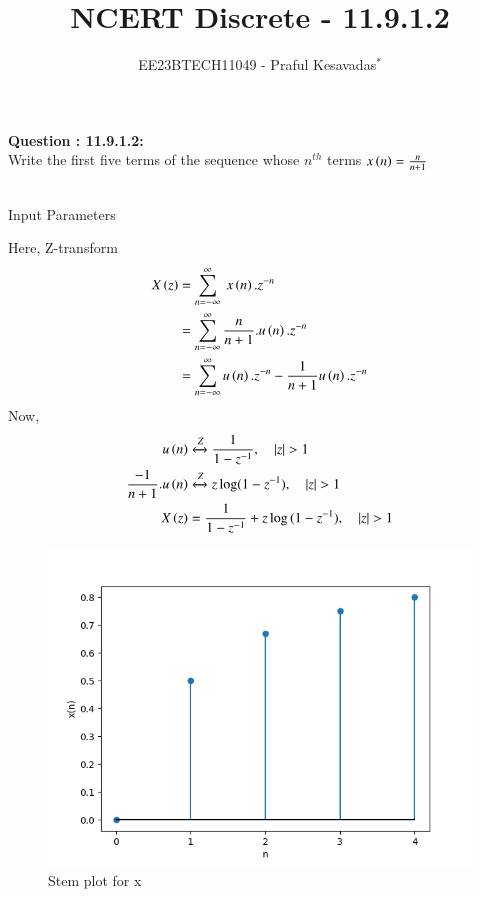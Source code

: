 \documentclass[journal,12pt,onecolumn]{IEEEtran}
\theoremstyle{remark}
\begin{document}

\vspace{3cm}

\title{NCERT Discrete - 11.9.1.2}
\author{EE23BTECH11049 - Praful Kesavadas$^{*}$%
}
\maketitle

\bigskip

\renewcommand{\thefigure}{\theenumi}
\renewcommand{\thetable}{\theenumi}

\textbf{Question : 11.9.1.2:}\\
Write the first five terms of the sequence whose $n^{th}$ terms  $x\left(n\right) = \frac{n}{n+1}$\\
\solution\\
\begin{table}[ht]
\centering

\caption{Input Parameters}
\end{table}
Here, Z-transform
\begin{align}
X\left(z\right) &= \sum_{n=-\infty}^\infty\ x\left(n\right).z^{-n}\\
&= \sum_{n=-\infty}^\infty \frac{n}{n+1}.u\left(n\right). z^{-n}\\
&= \sum_{n=-\infty}^\infty u\left(n\right).z^{-n} - \frac{1}{n+1} u\left(n\right).z^{-n}
\end{align}
Now, 
\begin{align}
u\brak{n} &\xleftrightarrow Z  \frac{1}{1-z^{-1}}, \quad{|z|>1}\\
\frac{-1}{n+1}.u\brak{n} &\xleftrightarrow Z  z\log(1-z^{-1}), \quad{|z|>1}\\
X\brak{z} &= \frac{1}{1-z^{-1}} + z\log{(1-z^{-1})} ,\quad{|z|>1}
\end{align}
\begin{figure}[ht!]
    \centering
    \includegraphics[width=\columnwidth]{figs/graph1.png}
    \caption{Stem plot for x}
    \label{fig:11.9.1.2fig1}
\end{figure}
\end{document}
